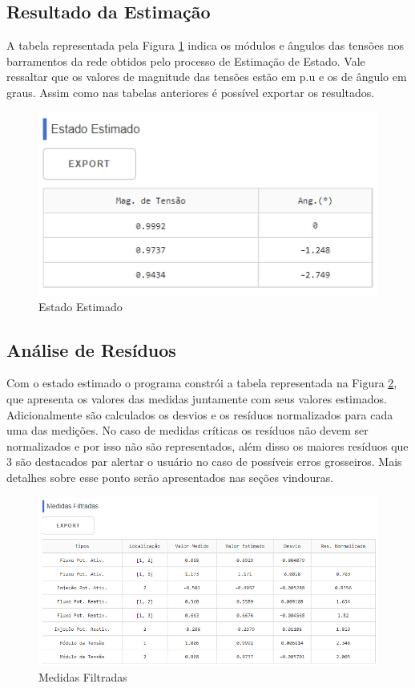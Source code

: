 \documentclass{article}
\begin{document}
\subsection{Resultado da Estimação}
A tabela representada pela Figura \ref{fig:results_SE} indica os módulos e ângulos das tensões nos barramentos da rede obtidos pelo processo de Estimação de Estado. Vale ressaltar que os valores de magnitude das tensões estão em p.u e os de ângulo em graus. Assim como nas tabelas anteriores é possível exportar os resultados.  
\begin{figure}[H]
    \centering
    \includegraphics[scale = .65]{Imagens/Medidas_Estimadas_Ferramenta.PNG}
    \caption{Estado Estimado}
    \label{fig:results_SE}
\end{figure}


\subsection{Análise de Resíduos}
Com o estado estimado o programa constrói a tabela representada na Figura \ref{fig:meds_filters}, que apresenta os valores das medidas juntamente com seus valores estimados. Adicionalmente são calculados os desvios e os resíduos normalizados para cada uma das medições. No caso de medidas críticas os resíduos não devem ser normalizados e por isso não são representados, além disso os maiores resíduos que 3 são destacados par alertar o usuário no caso de possíveis erros grosseiros. Mais detalhes sobre esse ponto serão apresentados nas seções vindouras.
\begin{figure}[H]
    \centering
    \includegraphics[scale = .5]{Imagens/Residuos_Normalizados_Ferramenta.PNG}
    \caption{Medidas Filtradas}
    \label{fig:meds_filters}
\end{figure}
\end{document}
